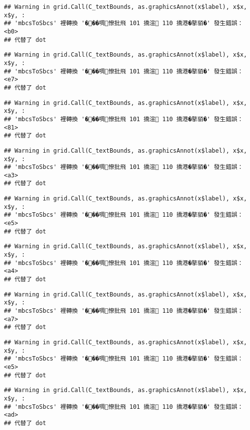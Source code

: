 \documentclass[
]{article}
\begin{document}
\begin{verbatim}
## Warning in grid.Call(C_textBounds, as.graphicsAnnot(x$label), x$x, x$y, :
## 'mbcsToSbcs' 裡轉換 '���啁憭批飛 101 撟渲 110 撟港�摮貊�' 發生錯誤：<b0>
## 代替了 dot
\end{verbatim}

\begin{verbatim}
## Warning in grid.Call(C_textBounds, as.graphicsAnnot(x$label), x$x, x$y, :
## 'mbcsToSbcs' 裡轉換 '���啁憭批飛 101 撟渲 110 撟港�摮貊�' 發生錯誤：<e7>
## 代替了 dot
\end{verbatim}

\begin{verbatim}
## Warning in grid.Call(C_textBounds, as.graphicsAnnot(x$label), x$x, x$y, :
## 'mbcsToSbcs' 裡轉換 '���啁憭批飛 101 撟渲 110 撟港�摮貊�' 發生錯誤：<81>
## 代替了 dot
\end{verbatim}

\begin{verbatim}
## Warning in grid.Call(C_textBounds, as.graphicsAnnot(x$label), x$x, x$y, :
## 'mbcsToSbcs' 裡轉換 '���啁憭批飛 101 撟渲 110 撟港�摮貊�' 發生錯誤：<a3>
## 代替了 dot
\end{verbatim}

\begin{verbatim}
## Warning in grid.Call(C_textBounds, as.graphicsAnnot(x$label), x$x, x$y, :
## 'mbcsToSbcs' 裡轉換 '���啁憭批飛 101 撟渲 110 撟港�摮貊�' 發生錯誤：<e5>
## 代替了 dot
\end{verbatim}

\begin{verbatim}
## Warning in grid.Call(C_textBounds, as.graphicsAnnot(x$label), x$x, x$y, :
## 'mbcsToSbcs' 裡轉換 '���啁憭批飛 101 撟渲 110 撟港�摮貊�' 發生錯誤：<a4>
## 代替了 dot
\end{verbatim}

\begin{verbatim}
## Warning in grid.Call(C_textBounds, as.graphicsAnnot(x$label), x$x, x$y, :
## 'mbcsToSbcs' 裡轉換 '���啁憭批飛 101 撟渲 110 撟港�摮貊�' 發生錯誤：<a7>
## 代替了 dot
\end{verbatim}

\begin{verbatim}
## Warning in grid.Call(C_textBounds, as.graphicsAnnot(x$label), x$x, x$y, :
## 'mbcsToSbcs' 裡轉換 '���啁憭批飛 101 撟渲 110 撟港�摮貊�' 發生錯誤：<e5>
## 代替了 dot
\end{verbatim}

\begin{verbatim}
## Warning in grid.Call(C_textBounds, as.graphicsAnnot(x$label), x$x, x$y, :
## 'mbcsToSbcs' 裡轉換 '���啁憭批飛 101 撟渲 110 撟港�摮貊�' 發生錯誤：<ad>
## 代替了 dot
\end{verbatim}
\end{document}
